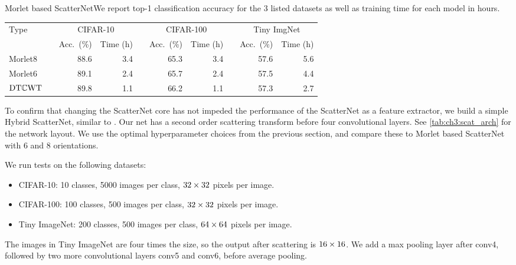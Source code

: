 \begin{table}[ht]
{  Morlet based ScatterNet}{We report top-1 classification accuracy for the 3
  listed datasets as well as training time for each model in hours.}
  \label{tab:ch3:comparison}
  \begin{tabular}{lcrrcrrcrr}
    \toprule
    Type & \phantom{abc} & \multicolumn{2}{c}{CIFAR-10} && \multicolumn{2}{c}{CIFAR-100}
         && \multicolumn{2}{c}{Tiny ImgNet} \\\cmidrule{3-4}\cmidrule{6-7}\cmidrule{9-10}
         && Acc.\ (\%) & Time (h) && Acc.\ (\%) & Time (h) && Acc.\ (\%) & Time (h)\\\midrule
    Morlet8 && 88.6 & 3.4 && 65.3 & 3.4 && 57.6 & 5.6 \\
    Morlet6 && 89.1 & 2.4 && 65.7 & 2.4 && 57.5 & 4.4 \\
    $\mathrm{DT}\mathbb{C}\mathrm{WT}$ && 89.8 & 1.1 && 66.2 & 1.1 && 57.3 & 2.7 \\\bottomrule
  \end{tabular}
\end{table}
To confirm that changing the ScatterNet core has not impeded the
performance of the ScatterNet as a feature extractor, we build a simple Hybrid
ScatterNet, similar to \cite{oyallon_hybrid_2017, oyallon_scaling_2017}. Our net 
has a second order scattering transform before four convolutional layers. See \autoref{tab:ch3:scat_arch}
for the network layout.
We use the optimal hyperparameter choices from the previous section, and compare
these to Morlet based ScatterNet with 6 and 8 orientations.

We run tests on the following datasets:
\begin{itemize}
  \item CIFAR-10: 10 classes, 5000 images per class, $32\times 32$ pixels per image.
  \item CIFAR-100: 100 classes, 500 images per class, $32\times 32$ pixels per image.
  \item Tiny ImageNet\cite{li_tiny_2017}: 200 classes, 500 images per class,
    $64 \times 64$ pixels per image.
\end{itemize}

The images in Tiny ImageNet are four times the size, so the output after
scattering is $16\times 16$. We add a max pooling layer after conv4, followed
by two more convolutional layers conv5 and conv6, before average pooling.

